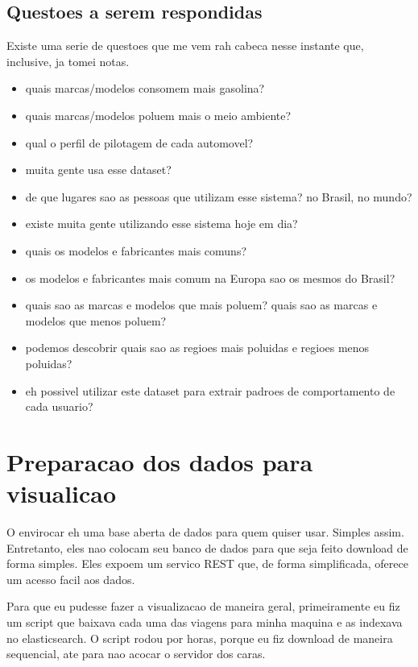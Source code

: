 \documentclass[10pt, conference]{IEEEtran}
\begin{document}
\subsection{Questoes a serem respondidas}
Existe uma serie de questoes que me vem rah cabeca nesse instante que,
inclusive, ja tomei notas.

\begin{itemize}
  \item quais marcas/modelos consomem mais gasolina?
  \item quais marcas/modelos poluem mais o meio ambiente?
  \item qual o perfil de pilotagem de cada automovel?
  \item muita gente usa esse dataset?
  \item de que lugares sao as pessoas que utilizam esse sistema? no Brasil, no mundo?
  \item existe muita gente utilizando esse sistema hoje em dia?
  \item quais os modelos e fabricantes mais comuns?
  \item os modelos e fabricantes mais comum na Europa sao os mesmos do Brasil?
  \item quais sao as marcas e modelos que mais poluem? quais sao as marcas e modelos que menos poluem?
  \item podemos descobrir quais sao as regioes mais poluidas e regioes menos poluidas?
  \item eh possivel utilizar este dataset para extrair padroes de comportamento de cada usuario?
\end{itemize}




\section{Preparacao dos dados para visualicao}

O envirocar eh uma base aberta de dados para quem quiser usar. Simples assim. Entretanto,
eles nao colocam seu banco de dados para que seja feito download de forma simples. Eles 
expoem um servico REST que, de forma simplificada, oferece um acesso facil aos dados.

Para que eu pudesse fazer a visualizacao de maneira geral, primeiramente eu fiz um script
que baixava cada uma das viagens para minha maquina e as indexava no elasticsearch. O script
rodou por horas, porque eu fiz download de maneira sequencial, ate para nao acocar o servidor
dos caras.
\end{document}
